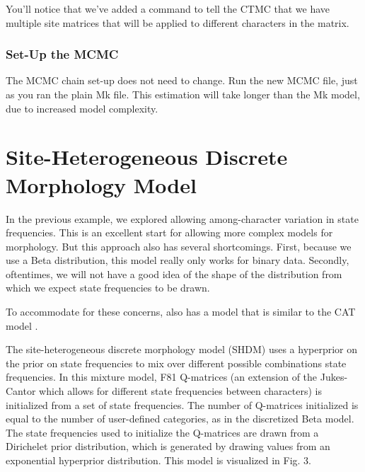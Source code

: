 You'll notice that we've added a command to tell the CTMC that we have multiple site matrices that will be applied to different characters in the matrix.

\medskip
\subsubsection{Set-Up the MCMC}

The MCMC chain set-up does not need to change. 
Run the new MCMC file, just as you ran the plain Mk file.
This estimation will take longer than the Mk model, due to increased model complexity. \par


\section{Site-Heterogeneous Discrete Morphology Model} \label{sec:dm_dir}

\begin{figure}[h!]
\label{fig:module-relaxed morphology}
\end{figure}

In the previous example, we explored allowing among-character variation in state frequencies.
This is an excellent start for allowing more complex models for morphology.
But this approach also has several shortcomings.
First, because we use a Beta distribution, this model really only works for binary data.
Secondly, oftentimes, we will not have a good idea of the shape of the distribution from which we expect state frequencies to be drawn. \par
To accommodate for these concerns,  also has a model that is similar to the CAT model \citep{lartillot04}. \par
The site-heterogeneous discrete morphology model (SHDM) uses a hyperprior on the prior on state frequencies to mix over different possible combinations state frequencies.
In this mixture model, F81 Q-matrices (an extension of the Jukes-Cantor which allows for different state frequencies between characters) is initialized from a set of state frequencies.
The number of Q-matrices initialized is equal to the number of user-defined categories, as in the discretized Beta model.
The state frequencies used to initialize the Q-matrices are drawn from a Dirichelet prior distribution, which is generated by drawing values from an exponential hyperprior distribution. 
This model is visualized in Fig. 3.\par

